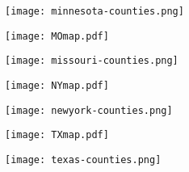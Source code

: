 \documentclass[10pt]{article}
\begin{document}
\begin{figure} 
  \begin{center}
    \texttt{[image: minnesota-counties.png]}
  \end{center}
\end{figure}

\begin{landscape}

\end{landscape}

\begin{figure} 
  \begin{center}
    \texttt{[image: MOmap.pdf]}
  \end{center}
\end{figure}

\begin{figure} 
  \begin{center}
    \texttt{[image: missouri-counties.png]}
  \end{center}
\end{figure}

\begin{landscape}

\end{landscape}

\begin{landscape}
\begin{figure} 
  \begin{center}
    \texttt{[image: NYmap.pdf]}
  \end{center}
\end{figure}
\end{landscape}

\begin{landscape}
\begin{figure} 
  \begin{center}
    \texttt{[image: newyork-counties.png]}
  \end{center}
\end{figure}
\end{landscape}

\begin{landscape}

\end{landscape}

\begin{figure} 
  \begin{center}
    \texttt{[image: TXmap.pdf]}
  \end{center}
\end{figure}

\begin{figure} 
  \begin{center}
    \texttt{[image: texas-counties.png]}
  \end{center}
\end{figure}
\end{document}

